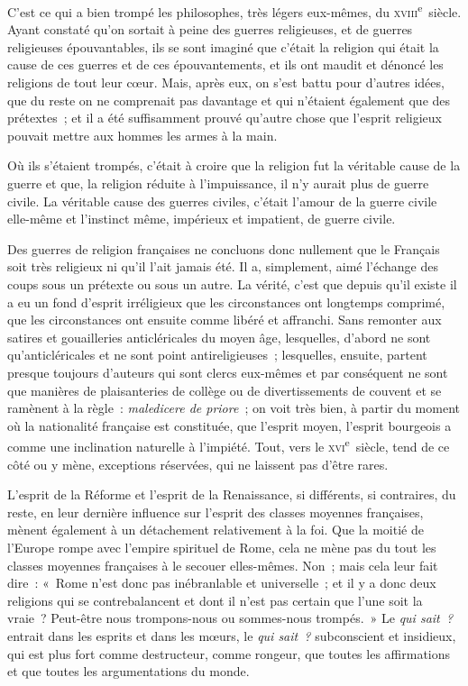 \documentclass[french,twoside]{book} %
\begin{document}
 C’est ce qui a bien trompé les philosophes, très légers eux-mêmes, du \textsc{xviii}\textsuperscript{e} siècle. Ayant constaté qu’on sortait à peine des guerres religieuses, et de guerres religieuses épouvantables, ils se sont imaginé que c’était la religion qui était la cause de ces guerres et de ces épouvantements, et ils ont maudit et dénoncé les religions de tout leur cœur. Mais, après eux, on s’est battu pour d’autres idées, que du reste on ne comprenait pas davantage et qui n’étaient également que des prétextes ; et il a été suffisamment prouvé qu’autre chose que l’esprit religieux pouvait mettre aux hommes les armes à la main.\par
Où ils s’étaient trompés, c’était à croire que la religion fut la véritable cause de la guerre et que, la religion réduite à l’impuissance, il n’y aurait plus de guerre civile. La véritable cause des guerres civiles, c’était l’amour de la guerre civile elle-même et l’instinct même, impérieux et impatient, de guerre civile.\par
Des guerres de religion françaises ne concluons donc nullement que le Français soit très religieux ni qu’il l’ait jamais été. Il a, simplement, aimé l’échange des coups sous un prétexte ou sous un autre. La vérité, c’est que depuis qu’il existe il a eu un fond d’esprit irréligieux que les circonstances ont longtemps comprimé, que les circonstances  ont ensuite comme libéré et affranchi. Sans remonter aux satires et gouailleries anticléricales du moyen âge, lesquelles, d’abord ne sont qu’anticléricales et ne sont point antireligieuses ; lesquelles, ensuite, partent presque toujours d’auteurs qui sont clercs eux-mêmes et par conséquent ne sont que manières de plaisanteries de collège ou de divertissements de couvent et se ramènent à la règle : {\itshape maledicere de priore} ; on voit très bien, à partir du moment où la nationalité française est constituée, que l’esprit moyen, l’esprit bourgeois a comme une inclination naturelle à l’impiété. Tout, vers le \textsc{xvi}\textsuperscript{e} siècle, tend de ce côté ou y mène, exceptions réservées, qui ne laissent pas d’être rares.\par
L’esprit de la Réforme et l’esprit de la Renaissance, si différents, si contraires, du reste, en leur dernière influence sur l’esprit des classes moyennes françaises, mènent également à un détachement relativement à la foi. Que la moitié de l’Europe rompe avec l’empire spirituel de Rome, cela ne mène pas du tout les classes moyennes françaises à le secouer elles-mêmes. Non ; mais cela leur fait dire : « Rome n’est donc pas inébranlable et universelle ; et il y a donc deux religions qui se contrebalancent et dont il n’est pas certain que l’une soit la vraie ? Peut-être nous trompons-nous ou  sommes-nous trompés. » Le {\itshape qui sait ?} entrait dans les esprits et dans les mœurs, le {\itshape qui sait ?} subconscient et insidieux, qui est plus fort comme destructeur, comme rongeur, que toutes les affirmations et que toutes les argumentations du monde.\par
\end{document}

